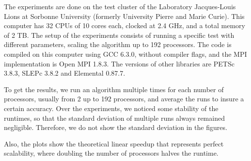 The experiments are done on the test cluster of the Laboratory Jacques-Louis Lions at Sorbonne University (formerly University Pierre and Marie Curie).
This computer has 32 CPUs of 10 cores each, clocked at 2.4 GHz, and a total memory of 2 TB.
The setup of the experiments consists of running a specific test with different parameters, scaling the algorithm up to 192 processors.
The code is compiled on this computer using GCC 6.3.0, without compiler flags, and the MPI implementation is Open MPI 1.8.3.
The versions of other libraries are PETSc 3.8.3, SLEPc 3.8.2 and Elemental 0.87.7.

To get the results, we run an algorithm multiple times for each number of processors, usually from 2 up to 192 processors, and average the runs to insure a certain accuracy.
Over the experiments, we noticed some stability of the runtimes, so that the standard deviation of multiple runs always remained negligible.
Therefore, we do not show the standard deviation in the figures.

Also, the plots show the theoretical linear speedup that represents perfect scalability, where doubling the number of processors halves the runtime.
